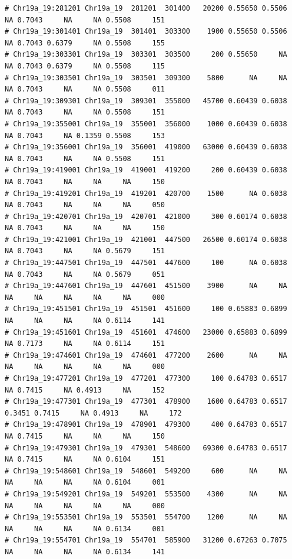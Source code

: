 \documentclass{article}\usepackage[]{graphicx}\usepackage[]{color}
\makeatletter
\newenvironment{kframe}{%
 \def\at@end@of@kframe{}%
 \ifinner\ifhmode%
  \def\at@end@of@kframe{\end{minipage}}%
  \begin{minipage}{\columnwidth}%
 \fi\fi%
 \def\FrameCommand##1{\hskip\@totalleftmargin \hskip-\fboxsep
 \colorbox{shadecolor}{##1}\hskip-\fboxsep
     \hskip-\linewidth \hskip-\@totalleftmargin \hskip\columnwidth}%
 \MakeFramed {\advance\hsize-\width
   \@totalleftmargin\z@ \linewidth\hsize
   \@setminipage}}%
 {\par\unskip\endMakeFramed%
 \at@end@of@kframe}
\newenvironment{knitrout}{}{} %
\makeatother
\begin{document}
\begin{knitrout}
\begin{kframe}
\begin{verbatim}
# Chr19a_19:281201 Chr19a_19  281201  301400   20200 0.55650 0.5506     NA 0.7043     NA     NA 0.5508     151
# Chr19a_19:301401 Chr19a_19  301401  303300    1900 0.55650 0.5506     NA 0.7043 0.6379     NA 0.5508     155
# Chr19a_19:303301 Chr19a_19  303301  303500     200 0.55650     NA     NA 0.7043 0.6379     NA 0.5508     115
# Chr19a_19:303501 Chr19a_19  303501  309300    5800      NA     NA     NA 0.7043     NA     NA 0.5508     011
# Chr19a_19:309301 Chr19a_19  309301  355000   45700 0.60439 0.6038     NA 0.7043     NA     NA 0.5508     151
# Chr19a_19:355001 Chr19a_19  355001  356000    1000 0.60439 0.6038     NA 0.7043     NA 0.1359 0.5508     153
# Chr19a_19:356001 Chr19a_19  356001  419000   63000 0.60439 0.6038     NA 0.7043     NA     NA 0.5508     151
# Chr19a_19:419001 Chr19a_19  419001  419200     200 0.60439 0.6038     NA 0.7043     NA     NA     NA     150
# Chr19a_19:419201 Chr19a_19  419201  420700    1500      NA 0.6038     NA 0.7043     NA     NA     NA     050
# Chr19a_19:420701 Chr19a_19  420701  421000     300 0.60174 0.6038     NA 0.7043     NA     NA     NA     150
# Chr19a_19:421001 Chr19a_19  421001  447500   26500 0.60174 0.6038     NA 0.7043     NA     NA 0.5679     151
# Chr19a_19:447501 Chr19a_19  447501  447600     100      NA 0.6038     NA 0.7043     NA     NA 0.5679     051
# Chr19a_19:447601 Chr19a_19  447601  451500    3900      NA     NA     NA     NA     NA     NA     NA     000
# Chr19a_19:451501 Chr19a_19  451501  451600     100 0.65883 0.6899     NA     NA     NA     NA 0.6114     141
# Chr19a_19:451601 Chr19a_19  451601  474600   23000 0.65883 0.6899     NA 0.7173     NA     NA 0.6114     151
# Chr19a_19:474601 Chr19a_19  474601  477200    2600      NA     NA     NA     NA     NA     NA     NA     000
# Chr19a_19:477201 Chr19a_19  477201  477300     100 0.64783 0.6517     NA 0.7415     NA 0.4913     NA     152
# Chr19a_19:477301 Chr19a_19  477301  478900    1600 0.64783 0.6517 0.3451 0.7415     NA 0.4913     NA     172
# Chr19a_19:478901 Chr19a_19  478901  479300     400 0.64783 0.6517     NA 0.7415     NA     NA     NA     150
# Chr19a_19:479301 Chr19a_19  479301  548600   69300 0.64783 0.6517     NA 0.7415     NA     NA 0.6104     151
# Chr19a_19:548601 Chr19a_19  548601  549200     600      NA     NA     NA     NA     NA     NA 0.6104     001
# Chr19a_19:549201 Chr19a_19  549201  553500    4300      NA     NA     NA     NA     NA     NA     NA     000
# Chr19a_19:553501 Chr19a_19  553501  554700    1200      NA     NA     NA     NA     NA     NA 0.6134     001
# Chr19a_19:554701 Chr19a_19  554701  585900   31200 0.67263 0.7075     NA     NA     NA     NA 0.6134     141

\end{verbatim}
\end{kframe}
\end{knitrout}
\end{document}
